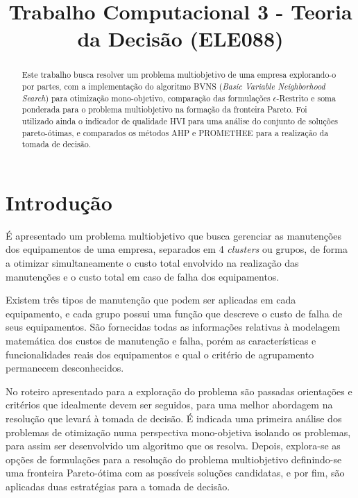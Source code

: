 \documentclass[conference]{IEEEtran}
\begin{document}
\title{Trabalho Computacional 3 - Teoria da Decisão (ELE088)}

\author{
\and
{}
\and
{}
}

\maketitle

\begin{abstract}
Este trabalho busca resolver um problema multiobjetivo de uma empresa explorando-o por partes, com a implementação do algoritmo BVNS (\textit{Basic Variable Neighborhood Search})
para otimização mono-objetivo, comparação das formulações $\epsilon$-Restrito e soma ponderada para o problema multiobjetivo na formação da fronteira Pareto. Foi utilizado ainda o indicador de qualidade
HVI para uma análise do conjunto de soluções pareto-ótimas, e comparados os métodos AHP e PROMETHEE para a realização da tomada de decisão.
\end{abstract}

\section{Introdução}

É apresentado um problema multiobjetivo que busca gerenciar as manutenções dos equipamentos de uma empresa, separados em 4 \textit{clusters} ou grupos,
de forma a otimizar simultaneamente o custo total envolvido na realização das manutenções e o custo total em caso de falha dos equipamentos.

Existem três tipos de manutenção que podem ser aplicadas em cada equipamento, e cada grupo possui uma função que descreve o custo de falha
de seus equipamentos. São fornecidas todas as informações relativas à modelagem matemática dos custos de manutenção e falha, porém as características e funcionalidades reais 
dos equipamentos e qual o critério de agrupamento permanecem desconhecidos.

No roteiro apresentado para a exploração do problema são passadas orientações e critérios que idealmente devem ser seguidos, para uma melhor abordagem na resolução que levará à tomada de decisão.
É indicada uma primeira análise dos problemas de otimização numa perspectiva mono-objetiva isolando os problemas, para assim ser desenvolvido um algoritmo que os resolva.
Depois, explora-se as opções de formulações para a resolução do problema multiobjetivo definindo-se uma fronteira Pareto-ótima com as possíveis soluções candidatas, e por fim,
são aplicadas duas estratégias para a tomada de decisão.
\end{document}
